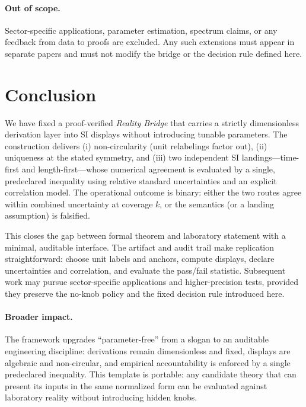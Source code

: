 \documentclass[11pt]{article}
\theoremstyle{plain}
\theoremstyle{definition}
\theoremstyle{remark}
\begin{document}
\paragraph{Out of scope.}
Sector-specific applications, parameter estimation, spectrum claims, or any feedback from data to proofs are excluded. Any such extensions must appear in separate papers and must not modify the bridge or the decision rule defined here.

\section{Conclusion}

We have fixed a proof-verified \emph{Reality Bridge} that carries a strictly dimensionless derivation layer into SI displays without introducing tunable parameters. The construction delivers (i) non-circularity (unit relabelings factor out), (ii) uniqueness at the stated symmetry, and (iii) two independent SI landings—time-first and length-first—whose numerical agreement is evaluated by a single, predeclared inequality using relative standard uncertainties and an explicit correlation model. The operational outcome is binary: either the two routes agree within combined uncertainty at coverage \(k\), or the semantics (or a landing assumption) is falsified.

This closes the gap between formal theorem and laboratory statement with a minimal, auditable interface. The artifact and audit trail make replication straightforward: choose unit labels and anchors, compute displays, declare uncertainties and correlation, and evaluate the pass/fail statistic. Subsequent work may pursue sector-specific applications and higher-precision tests, provided they preserve the no-knob policy and the fixed decision rule introduced here.

\paragraph{Broader impact.}
The framework upgrades “parameter-free” from a slogan to an auditable engineering discipline: derivations remain dimensionless and fixed, displays are algebraic and non-circular, and empirical accountability is enforced by a single predeclared inequality. This template is portable: any candidate theory that can present its inputs in the same normalized form can be evaluated against laboratory reality without introducing hidden knobs.

\appendix
\end{document}
